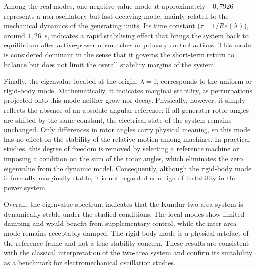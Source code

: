 Among the real modes, one negative value mode at approximately $-0,7926$ represents a non-oscillatory but fast-decaying mode, 
mainly related to the mechanical dynamics of the generating units. Its time constant ($\tau = 1/Re(\lambda)$), around $1,26$~s, indicates a rapid stabilising
effect that brings the system back to equilibrium after active-power mismatches or primary control actions. This mode is considered 
dominant in the sense that it governs the short-term return to balance but does not limit the overall stability margins of the system.

Finally, the eigenvalue located at the origin, $\lambda = 0$, corresponds to the uniform or rigid-body mode. 
Mathematically, it indicates marginal stability, as perturbations projected onto this mode neither grow nor decay.
Physically, however, it simply reflects the absence of an absolute angular reference: if all generator rotor angles are shifted by the same constant, 
the electrical state of the system remains unchanged. Only differences in rotor angles carry physical meaning, so this mode has no effect on the stability 
of the relative motion among machines. In practical studies, this degree of freedom is removed by selecting a reference machine or imposing a condition on 
the sum of the rotor angles, which eliminates the zero eigenvalue from the dynamic model. Consequently, although the rigid-body mode is formally marginally 
stable, it is not regarded as a sign of instability in the power system.

Overall, the eigenvalue spectrum indicates that the Kundur two-area system is dynamically stable under the studied conditions. 
The local modes show limited damping and would benefit from supplementary control, while the inter-area mode remains acceptably damped. 
The rigid-body mode is a physical artefact of the reference frame and not a true stability concern. These results are consistent with the 
classical interpretation of the two-area system and confirm its suitability as a benchmark for electromechanical oscillation studies.



